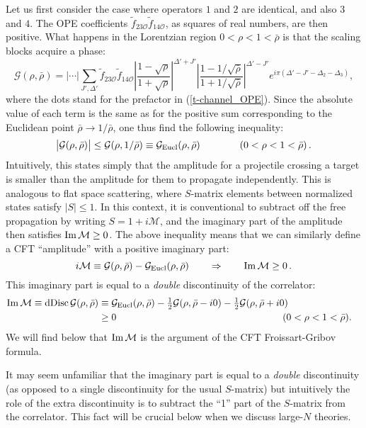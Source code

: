 \documentclass[11pt, reqno,preprint]{article}
\def\be{\begin{equation}}
\def\ee{\end{equation}}
\def\dDisc{{\rm dDisc}\,}
\def\OO{\mathcal{O}}
\def\rhobar{\bar{\rho}}
\def\j{J}
\def\GG{\mathcal{G}}
\begin{document}
Let us first consider the case where operators $1$ and $2$ are identical, and also $3$ and $4$.
The OPE coefficients $\tilde f_{23\OO}\tilde f_{14\OO}$, as squares of real numbers, are then positive.
What happens in the Lorentzian region $0{<}\rho{<}1{<}\rhobar$ is that the scaling blocks acquire a phase:
\be
\GG(\rho,\rhobar) = \big|\cdots\big|\sum_{\j',\Delta'} \tilde f_{23\OO}\tilde f_{14\OO} 
  \left|\frac{1-\sqrt{\rho}}{1+\sqrt{\rho}}\right|^{\Delta'+\j'}\left|\frac{1-1/\sqrt{\rhobar}}{1+1/\sqrt{\rhobar}}\right|^{\Delta'-\j'}
e^{i\pi(\Delta'-\j'-\Delta_2-\Delta_3)}, \label{t-channel_OPE1}
\ee
where the dots stand for the prefactor in (\ref{t-channel_OPE}).
Since the absolute value of each term is the same as for the positive sum corresponding to the Euclidean point $\rhobar\to 1/\rhobar$,
one thus find the following inequality:
\be
 \big| \GG(\rho,\rhobar)\big| \leq \GG(\rho,1/\rhobar)\equiv \GG_{\rm Eucl}(\rho,\rhobar) \qquad\qquad (0<\rho<1<\rhobar)\,. \label{inequality}
\ee
Intuitively, this states simply that the amplitude for a projectile crossing a target
is smaller than the amplitude for them to propagate independently.
This is analogous to flat space scattering,
where $S$-matrix elements between normalized states satisfy $|S|\leq 1$.
In this context, it is conventional to subtract off the free propagation by writing $S=1+i\mathcal{M}$,
and the imaginary part of the amplitude then satisfies ${\rm Im}\,\mathcal{M}\geq 0$.
The above inequality means that we can similarly define a CFT ``amplitude'' with a positive imaginary part:
\be
 i\mathcal{M}\equiv \GG(\rho,\rhobar)-\GG_{\rm Eucl}(\rho,\rhobar)\qquad\Rightarrow\qquad
 {\rm Im}\,\mathcal{M}\geq 0\,. \label{defM}
\ee
This imaginary part is equal to a \emph{double} discontinuity of the correlator:
\be\begin{aligned}
\label{dDisc}
{\rm Im}\,\mathcal{M}\equiv 
\dDisc \GG(\rho,\rhobar)&\equiv \GG_{\rm Eucl}(\rho,\rhobar)-\tfrac12\GG(\rho,\rhobar-i0)- \tfrac12\GG(\rho,\rhobar+i0)&
\\ &\geq 0 \hspace{60mm}(0<\rho<1<\rhobar).
\end{aligned}\ee
We will find below that ${\rm Im}\,\mathcal{M}$ is the argument of the CFT Froissart-Gribov formula.

It may seem unfamiliar that the imaginary part
is equal to a \emph{double} discontinuity (as opposed to a single discontinuity for the usual $S$-matrix)
but intuitively the role of the extra discontinuity is to subtract the ``1'' part of the $S$-matrix from the correlator.
This fact will be crucial below when we discuss large-$N$ theories.
\end{document}
